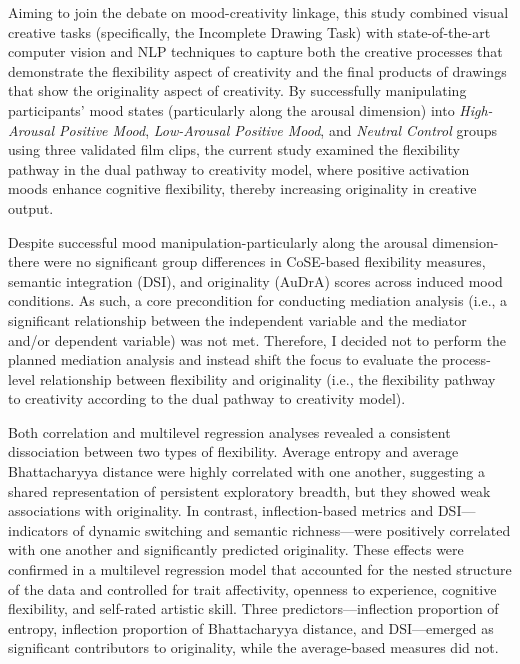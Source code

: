 \documentclass[../MA_Thesis.tex]{subfiles}
\begin{document}
Aiming to join the debate on mood-creativity linkage, this study combined visual creative tasks (specifically, the Incomplete Drawing Task) with state-of-the-art computer vision and NLP techniques to capture both the creative processes that demonstrate the flexibility aspect of creativity and the final products of drawings that show the originality aspect of creativity. By successfully manipulating participants’ mood states (particularly along the arousal dimension) into \textit{High-Arousal Positive Mood}, \textit{Low-Arousal Positive Mood}, and \textit{Neutral Control} groups using three validated film clips, the current study examined the flexibility pathway in the dual pathway to creativity model, where positive activation moods enhance cognitive flexibility, thereby increasing originality in creative output.

Despite successful mood manipulation-particularly along the arousal dimension-there were no significant group differences in CoSE-based flexibility measures, semantic integration (DSI), and originality (AuDrA) scores across induced mood conditions. As such, a core precondition for conducting mediation analysis (i.e., a significant relationship between the independent variable and the mediator and/or dependent variable) was not met. Therefore, I decided not to perform the planned mediation analysis and instead shift the focus to evaluate the process-level relationship between flexibility and originality (i.e., the flexibility pathway to creativity according to the dual pathway to creativity model). 

Both correlation and multilevel regression analyses revealed a consistent dissociation between two types of flexibility. Average entropy and average Bhattacharyya distance were highly correlated with one another, suggesting a shared representation of persistent exploratory breadth, but they showed weak associations with originality. In contrast, inflection-based metrics and DSI—indicators of dynamic switching and semantic richness—were positively correlated with one another and significantly predicted originality. These effects were confirmed in a multilevel regression model that accounted for the nested structure of the data and controlled for trait affectivity, openness to experience, cognitive flexibility, and self-rated artistic skill. Three predictors—inflection proportion of entropy, inflection proportion of Bhattacharyya distance, and DSI—emerged as significant contributors to originality, while the average-based measures did not.  
\end{document}
